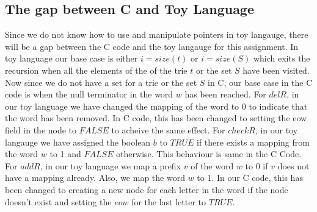 \documentclass[a4paper,11pt,fleqn]{scrartcl}
\begin{document}
\subsection{\color{blue}The gap between C and Toy Language}
Since we do not know how to use and manipulate pointers in toy langauge, there will be a gap between the C code and the toy langauge for this assignment. In toy language our base case is either $i = size(t)$ or $i = size(S)$ which exits the recursion when all the elements of the of the trie $t$ or the set $S$ have been visited. Now since we do not have a set for a trie or the set $S$ in C, our base case in the C code is when the null terminator in the word $w$ has been reached. For $delR$, in our toy language we have changed the mapping of the word to 0 to indicate that the word has been removed. In C code, this has been changed to setting the eow field in the node to $FALSE$ to acheive the same effect. For $checkR$, in our toy langauge we have assigned the boolean $b$ to $TRUE$ if there exists a mapping from the word $w$ to 1 and $FALSE$ otherwise. This behaviour is same in the C Code. For $addR$, in our toy language we map a prefix $v$ of the word $w$ to 0 if $v$ does not have a mapping already. Also, we map the word $w$ to 1. In our C code, this has been changed to creating a new node for each letter in the word if the node doesn't exist and setting the $eow$ for the last letter to $TRUE$.
\end{document}
